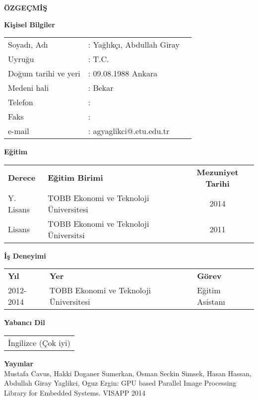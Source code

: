 \newpage
\pagestyle{plain}
\begin{center}
{\LARGE \bf \"OZGE\c{C}M\.{I}\c{S}}
\end{center}
\vspace{0.5cm}
{\bf Ki\c{s}isel Bilgiler}


\noindent
\begin{tabular}{@{}lll@{}}
Soyad{\i}, Ad{\i} & : Yağlıkçı, Abdullah Giray &\\
Uyru\u{g}u & : T.C.&\\
Do\u{g}um tarihi ve yeri & : 09.08.1988 Ankara&\\
Medeni hali & : Bekar& \\
Telefon & : &\\
Faks & : &\\
e-mail & : agyaglikci@.etu.edu.tr &\\
\end{tabular}

\vspace{0.5cm}
\noindent
{\bf E\u{g}itim}


\noindent
\begin{tabular}{@{}llc@{}}
{\bf Derece} & {\bf E\u{g}itim Birimi} & {\bf Mezuniyet Tarihi}\\
Y. Lisans & TOBB Ekonomi ve Teknoloji \"Universitesi & 2014\\
Lisans & TOBB Ekonomi ve Teknoloji \"Universitsi& 2011\\
\end{tabular}

\vspace{0.5cm}
\noindent
{\bf \.{I}\c{s} Deneyimi}


\noindent
\begin{tabular}{@{}lll@{}}
{\bf Y{\i}l} & {\bf Yer} & {\bf G\"orev}\\
2012-2014 & TOBB Ekonomi ve Teknoloji \"Universitesi & Eğitim Asistanı\\
\end{tabular}

\vspace{0.5cm}
\noindent
{\bf Yabanc{\i} Dil}


\noindent
\begin{tabular}{@{}l@{}}
\.{I}ngilizce (Çok iyi)\\
\end{tabular}


\vspace{0.5cm}
\noindent
{\bf Yay{\i}nlar} \\
\noindent
Mustafa Cavus, Hakki Doganer Sumerkan, Osman Seckin Simsek, Hasan Hassan, Abdullah Giray Yaglikci, Oguz Ergin: GPU based Parallel Image Processing Library for Embedded Systems. VISAPP 2014
